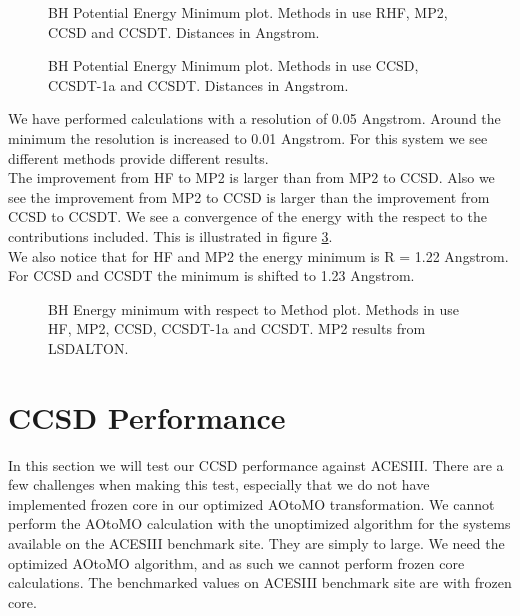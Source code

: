 \begin{figure}[h!]
\begin{center}
\caption{BH Potential Energy Minimum plot. Methods in use RHF, MP2, CCSD and CCSDT. Distances in Angstrom.}
\label{fig:zom1}
\end{center}
\end{figure}

\begin{figure}[h!]
\begin{center}
\caption{BH Potential Energy Minimum plot. Methods in use CCSD, CCSDT-1a and CCSDT. Distances in Angstrom.}
\label{fig:zom2}
\end{center}
\end{figure}






We have performed calculations with a resolution of 0.05 Angstrom. Around the minimum the resolution is increased to 0.01 Angstrom.  For this system we see different methods provide different results. \\

The improvement from HF to MP2 is larger than from MP2 to CCSD. Also we see the improvement from MP2 to CCSD is larger than the improvement from CCSD to CCSDT. We see a convergence of the energy with the respect to the contributions included. This is illustrated in figure \ref{fig:zom3}. \\

We also notice that for HF and MP2 the energy minimum is R = 1.22 Angstrom. For CCSD and CCSDT the minimum is shifted to 1.23 Angstrom. 

\newpage

\begin{figure}[h!]
\begin{center}
\caption{BH Energy minimum with respect to Method plot. Methods in use HF, MP2, CCSD, CCSDT-1a and CCSDT. MP2 results from LSDALTON. }
\label{fig:zom3}
\end{center}
\end{figure}

\section{CCSD Performance}
In this section we will test our CCSD performance against ACESIII. There are a few challenges when making this test, especially that we do not have implemented frozen core in our optimized AOtoMO transformation. We cannot perform the AOtoMO calculation with the unoptimized algorithm for the systems available on the ACESIII benchmark site. They are simply to large. We need the optimized AOtoMO algorithm, and as such we cannot perform frozen core calculations. The benchmarked values on ACESIII benchmark site are with frozen core. \\

